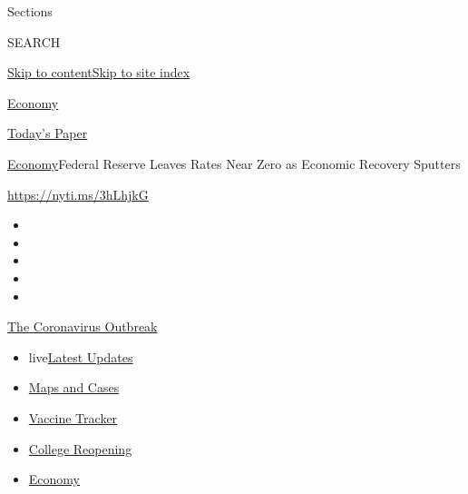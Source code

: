 Sections

SEARCH

\protect\hyperlink{site-content}{Skip to
content}\protect\hyperlink{site-index}{Skip to site index}

\href{https://www.nytimes3xbfgragh.onion/section/business/economy}{Economy}

\href{https://myaccount.nytimes3xbfgragh.onion/auth/login?response_type=cookie\&client_id=vi}{}

\href{https://www.nytimes3xbfgragh.onion/section/todayspaper}{Today's
Paper}

\href{/section/business/economy}{Economy}\textbar{}Federal Reserve
Leaves Rates Near Zero as Economic Recovery Sputters

\href{https://nyti.ms/3hLhjkG}{https://nyti.ms/3hLhjkG}

\begin{itemize}
\item
\item
\item
\item
\item
\end{itemize}

\href{https://www.nytimes3xbfgragh.onion/news-event/coronavirus?action=click\&pgtype=Article\&state=default\&region=TOP_BANNER\&context=storylines_menu}{The
Coronavirus Outbreak}

\begin{itemize}
\tightlist
\item
  live\href{https://www.nytimes3xbfgragh.onion/2020/08/03/world/coronavirus-covid-19.html?action=click\&pgtype=Article\&state=default\&region=TOP_BANNER\&context=storylines_menu}{Latest
  Updates}
\item
  \href{https://www.nytimes3xbfgragh.onion/interactive/2020/us/coronavirus-us-cases.html?action=click\&pgtype=Article\&state=default\&region=TOP_BANNER\&context=storylines_menu}{Maps
  and Cases}
\item
  \href{https://www.nytimes3xbfgragh.onion/interactive/2020/science/coronavirus-vaccine-tracker.html?action=click\&pgtype=Article\&state=default\&region=TOP_BANNER\&context=storylines_menu}{Vaccine
  Tracker}
\item
  \href{https://www.nytimes3xbfgragh.onion/2020/08/02/us/covid-college-reopening.html?action=click\&pgtype=Article\&state=default\&region=TOP_BANNER\&context=storylines_menu}{College
  Reopening}
\item
  \href{https://www.nytimes3xbfgragh.onion/live/2020/08/03/business/stock-market-today-coronavirus?action=click\&pgtype=Article\&state=default\&region=TOP_BANNER\&context=storylines_menu}{Economy}
\end{itemize}


